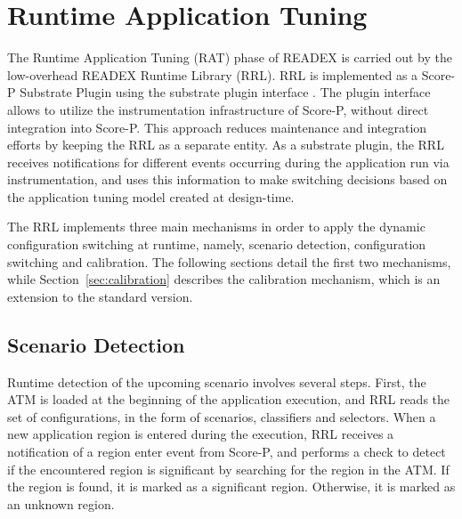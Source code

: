 \section{Runtime Application Tuning} \label{rat}

The Runtime Application Tuning (RAT) phase of READEX is carried out by the low-overhead READEX Runtime Library (RRL). RRL is implemented as a Score-P Substrate Plugin using the substrate plugin interface \cite{Schoene2017}. The plugin interface allows to utilize the instrumentation infrastructure of Score-P, without direct integration into Score-P. This approach reduces maintenance and integration efforts by keeping the RRL as a separate entity. As a substrate plugin, the RRL receives notifications for different events occurring during the application run via instrumentation, and uses this information to make switching decisions based on the application tuning model created at design-time.

The RRL implements three main mechanisms in order to apply the dynamic configuration switching at runtime, namely, scenario detection, configuration switching and calibration. The following sections detail the first two mechanisms, while Section~\ref{sec:calibration} describes the calibration mechanism, which is an extension to the standard version.


\subsection{Scenario Detection}\label{scenario-detection}
Runtime detection of the upcoming scenario involves several steps. First, the ATM is loaded at the beginning of the application execution, and RRL reads the set of configurations, in the form of scenarios, classifiers and selectors. When a new application region is entered during the execution, RRL receives a notification of a region enter event from Score-P, and performs a check to detect if the encountered region is significant by searching for the region in the ATM. If the region is found, it is marked as a significant region. Otherwise, it is marked as an unknown region. 

